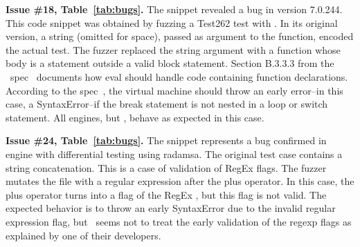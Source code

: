 \documentclass[smallextended]{svjour3}
\begin{document}
\vspace{1ex}\noindent\textbf{Issue \#18, Table~\ref{tab:bugs}.} The
snippet {\footnotesize{}}
revealed a bug in \textbf{\veight{}} version 7.0.244. This code snippet was
obtained by fuzzing a Test262 test with \quickfuzz. In its original
version, a string (omitted for space), passed as argument to the
 function, encoded the actual test. The fuzzer replaced
the string argument with a function whose body is a 
statement outside a valid block statement. Section B.3.3.3 from the
\es\ spec~\cite{spec-b333} documents how eval should handle code
containing function declarations.  According to the
spec~\cite{break-statement}, the virtual machine should throw an early
error--in this case, a SyntaxError--if the break statement is not
nested in a loop or switch statement. All engines, but \veight{},
behave as expected in this case.





\vspace{1ex}\noindent\textbf{Issue \#24, Table~\ref{tab:bugs}.} The snippet
 represents a bug confirmed in \textbf{\hermes} engine with
differential testing using radamsa.
The original test case contains a string concatenation.
This is a case of validation of RegEx flags. The fuzzer mutates
the file with a regular expression  after the plus operator.
In this case, the plus operator turns into a flag of the RegEx ,
but this flag is not valid. The expected behavior is to throw an early
SyntaxError due to the invalid regular expression flag,
but \hermes\ seems not to treat the early validation of the regexp flags
as explained by one of their developers.
\end{document}
